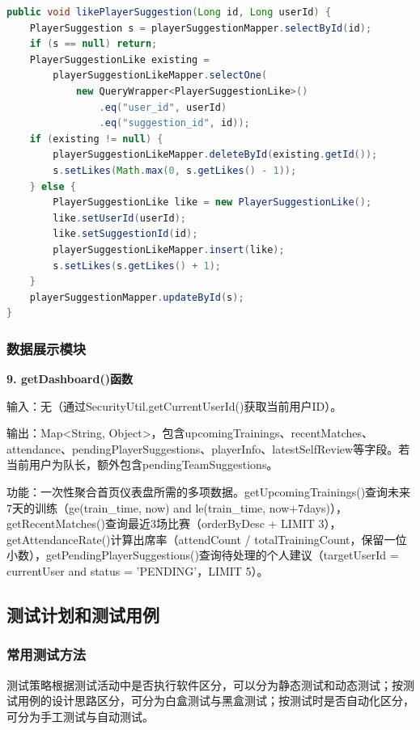 \documentclass[12pt,a4paper]{ctexart}
\begin{document}
\begin{lstlisting}[language=Java]
public void likePlayerSuggestion(Long id, Long userId) {
    PlayerSuggestion s = playerSuggestionMapper.selectById(id);
    if (s == null) return;
    PlayerSuggestionLike existing =
        playerSuggestionLikeMapper.selectOne(
            new QueryWrapper<PlayerSuggestionLike>()
                .eq("user_id", userId)
                .eq("suggestion_id", id));
    if (existing != null) {
        playerSuggestionLikeMapper.deleteById(existing.getId());
        s.setLikes(Math.max(0, s.getLikes() - 1));
    } else {
        PlayerSuggestionLike like = new PlayerSuggestionLike();
        like.setUserId(userId);
        like.setSuggestionId(id);
        playerSuggestionLikeMapper.insert(like);
        s.setLikes(s.getLikes() + 1);
    }
    playerSuggestionMapper.updateById(s);
}
\end{lstlisting}

\subsubsection{数据展示模块}

\textbf{9. getDashboard()函数}

输入：无（通过SecurityUtil.getCurrentUserId()获取当前用户ID）。

输出：Map<String, Object>，包含upcomingTrainings、recentMatches、attendance、pendingPlayerSuggestions、playerInfo、latestSelfReview等字段。若当前用户为队长，额外包含pendingTeamSuggestions。

功能：一次性聚合首页仪表盘所需的多项数据。getUpcomingTrainings()查询未来7天的训练（ge(train\_time, now) and le(train\_time, now+7days)），getRecentMatches()查询最近3场比赛（orderByDesc + LIMIT 3），getAttendanceRate()计算出席率（attendCount / totalTrainingCount，保留一位小数），getPendingPlayerSuggestions()查询待处理的个人建议（targetUserId = currentUser and status = 'PENDING'，LIMIT 5）。

\subsection{测试计划和测试用例}

\subsubsection{常用测试方法}

测试策略根据测试活动中是否执行软件区分，可以分为静态测试和动态测试；按测试用例的设计思路区分，可分为白盒测试与黑盒测试；按测试时是否自动化区分，可分为手工测试与自动测试。
\end{document}
